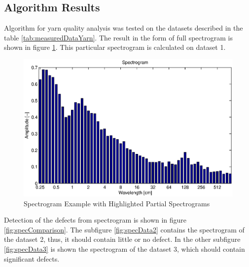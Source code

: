 \documentclass[twoside]{ctuthesis}
\theoremstyle{plain}
\theoremstyle{definition}
\theoremstyle{note}
\begin{document}
\subsection{Algorithm Results}
Algorithm for yarn quality analysis was tested on the datasets described in the table \ref{tab:measuredDataYarn}. The result in the form of full spectrogram is shown in figure \ref{fig:yarnSpec_1}. This particular spectrogram is calculated on dataset 1.

\begin{figure}[h]
	\centering
	\includegraphics[width=1.0\textwidth]{prize4.eps}
	\caption{Spectrogram Example with Highlighted Partial Spectrograms}
	\label{fig:yarnSpec_1}
\end{figure}
Detection of the defects from spectrogram is shown in figure \ref{fig:specComparison}. The subfigure \ref{fig:specData2} contains the spectrogram of the dataset 2, thus, it should contain little or no defect. In the other subfigure \ref{fig:specData3} is shown the spectrogram of the dataset 3, which should contain significant defects.
\end{document}
